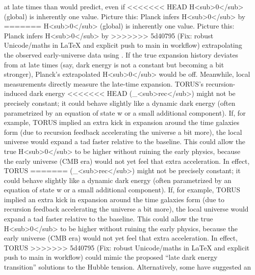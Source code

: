 \documentclass[]{article}
\begin{document}
\begin{enumerate}
  at late times than \LambdaCDM would predict, even if
<<<<<<< HEAD
  H\textless sub\textgreater0\textless/sub\textgreater{} (global) is
  inherently one value. Picture this: Planck infers
  H\textless sub\textgreater0\textless/sub\textgreater{} by
=======
  H\textless{}sub\textgreater{}0\textless{}/sub\textgreater{} (global)
  is inherently one value. Picture this: Planck infers
  H\textless{}sub\textgreater{}0\textless{}/sub\textgreater{} by
>>>>>>> 5d40795 (Fix: robust Unicode/maths in LaTeX and explicit push to main in workflow)
  extrapolating the observed early-universe data using \LambdaCDM. If the true
  expansion history deviates from \LambdaCDM at late times (say, dark energy
  is not a constant but becoming a bit stronger), Planck's extrapolated
  H\textless{}sub\textgreater{}0\textless{}/sub\textgreater{} would be
  off. Meanwhile, local measurements directly measure the late-time
  expansion. TORUS's recursion-induced dark energy
<<<<<<< HEAD
  (\Lambda\_\textless sub\textgreater rec\textless/sub\textgreater) might not
  be precisely constant; it could behave slightly like a dynamic dark
  energy (often parametrized by an equation of state w or a small
  additional component). If, for example, TORUS implied an extra kick in
  expansion around the time galaxies form (due to recursion feedback
  accelerating the universe a bit more), the local universe would expand
  a tad faster relative to the \LambdaCDM baseline. This could allow the true
  H\textless sub\textgreater0\textless/sub\textgreater{} to be higher
  without ruining the early physics, because the early universe (CMB
  era) would not yet feel that extra acceleration. In effect, TORUS
=======
  (\Lambda\_\textless{}sub\textgreater{}rec\textless{}/sub\textgreater{})
  might not be precisely constant; it could behave slightly like a
  dynamic dark energy (often parametrized by an equation of state w or a
  small additional component). If, for example, TORUS implied an extra
  kick in expansion around the time galaxies form (due to recursion
  feedback accelerating the universe a bit more), the local universe
  would expand a tad faster relative to the \LambdaCDM baseline. This could
  allow the true
  H\textless{}sub\textgreater{}0\textless{}/sub\textgreater{} to be
  higher without ruining the early physics, because the early universe
  (CMB era) would not yet feel that extra acceleration. In effect, TORUS
>>>>>>> 5d40795 (Fix: robust Unicode/maths in LaTeX and explicit push to main in workflow)
  could mimic the proposed ``late dark energy transition'' solutions to
  the Hubble tension. Alternatively, some have suggested an

\end{enumerate}
\end{document}
